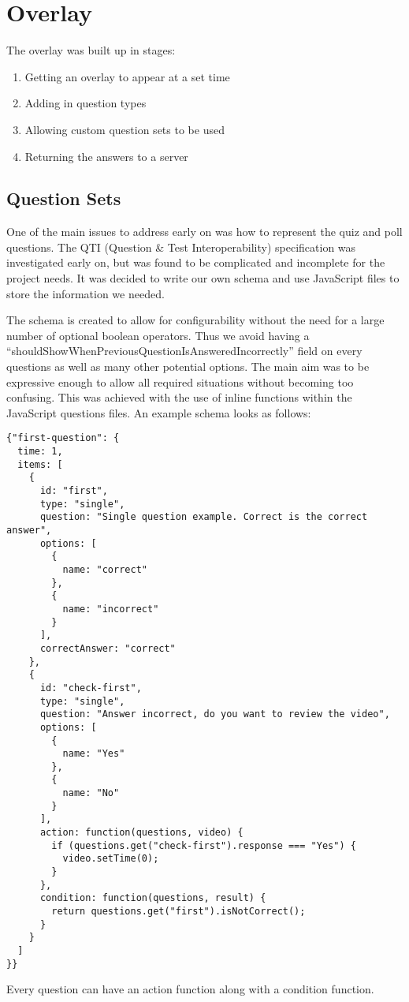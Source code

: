 \chapter{Overlay} \label{Chapter:Overlay}
The overlay was built up in stages:
\begin{enumerate}
\item Getting an overlay to appear at a set time
\item Adding in question types
\item Allowing custom question sets to be used
\item Returning the answers to a server
\end{enumerate}
\section{Question Sets} 
\label{Section:Question sets}
One of the main issues to address early on was how to represent the quiz and poll questions. The QTI (Question \& Test Interoperability) specification was investigated early on, but was found to be complicated and incomplete for the project needs. It was decided to write our own schema and use JavaScript files to store the information we needed. 

The schema is created to allow for configurability without the need for a large number of optional boolean operators. Thus we avoid having a ``shouldShowWhenPreviousQuestionIsAnsweredIncorrectly'' field on every questions as well as many other potential options. The main aim was to be expressive enough to allow all required situations without becoming too confusing. This was achieved with the use of inline functions within the JavaScript questions files. An example schema looks as follows:
\begin{lstlisting}
{"first-question": {
  time: 1,
  items: [
    {
      id: "first",
      type: "single",
      question: "Single question example. Correct is the correct answer",
      options: [
        {
          name: "correct"
        },
        {
          name: "incorrect"
        }
      ],
      correctAnswer: "correct"
    },
    {
      id: "check-first",
      type: "single",
      question: "Answer incorrect, do you want to review the video",
      options: [
        {
          name: "Yes"
        },
        {
          name: "No"
        }
      ],
      action: function(questions, video) {
        if (questions.get("check-first").response === "Yes") {
          video.setTime(0);
        }
      },
      condition: function(questions, result) {
        return questions.get("first").isNotCorrect();
      }
    }
  ]
}}
\end{lstlisting}
Every question can have an action function along with a condition function. 

